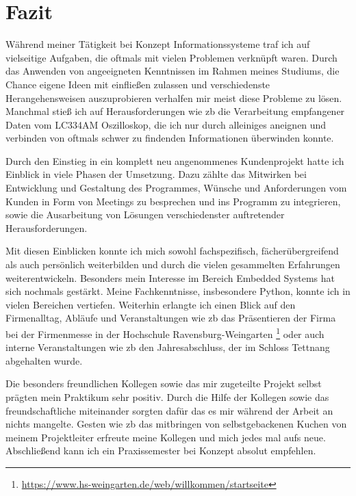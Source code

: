\chapter{Fazit}
\label{ch:fazit}

Während meiner Tätigkeit bei Konzept Informationssysteme traf ich auf vielseitige Aufgaben, 
die oftmals mit vielen Problemen verknüpft waren. Durch das Anwenden von angeeigneten 
Kenntnissen im Rahmen meines Studiums, die Chance eigene Ideen mit einfließen zulassen und 
verschiedenste Herangehensweisen auszuprobieren verhalfen mir meist diese Probleme zu 
lösen. Manchmal stieß ich auf Herausforderungen wie \ac{zb} die Verarbeitung empfangener 
Daten vom LC334AM Oszilloskop, die ich nur durch alleiniges aneignen und verbinden von 
oftmals schwer zu findenden Informationen überwinden konnte.

Durch den Einstieg in ein komplett neu angenommenes Kundenprojekt hatte ich Einblick in 
viele Phasen der Umsetzung. Dazu zählte das Mitwirken bei Entwicklung und Gestaltung des 
Programmes, Wünsche und Anforderungen vom Kunden in Form von Meetings zu besprechen und ins 
Programm zu integrieren, sowie die Ausarbeitung von Lösungen verschiedenster auftretender 
Herausforderungen.

Mit diesen Einblicken konnte ich mich sowohl fachspezifisch, fächerübergreifend als auch 
persönlich weiterbilden und durch die vielen gesammelten Erfahrungen weiterentwickeln. 
Besonders mein Interesse im Bereich Embedded Systems hat sich nochmals gestärkt. Meine 
Fachkenntnisse, insbesondere Python, konnte ich in vielen Bereichen vertiefen. Weiterhin 
erlangte ich einen Blick auf den Firmenalltag, Abläufe und Veranstaltungen wie \ac{zb} das 
Präsentieren der Firma bei der Firmenmesse in der Hochschule Ravensburg-Weingarten
\footnote{\url{https://www.hs-weingarten.de/web/willkommen/startseite}} oder auch interne 
Veranstaltungen wie \ac{zb} den Jahresabschluss, der im Schloss Tettnang abgehalten wurde.

Die besonders freundlichen Kollegen sowie das mir zugeteilte Projekt selbst prägten mein 
Praktikum sehr positiv. Durch die Hilfe der Kollegen sowie das freundschaftliche 
miteinander sorgten dafür das es mir während der Arbeit an nichts mangelte. Gesten wie 
\ac{zb} das mitbringen von selbstgebackenen Kuchen von meinem Projektleiter erfreute meine 
Kollegen und mich jedes mal aufs neue. Abschließend kann ich ein Praxissemester bei Konzept 
absolut empfehlen.